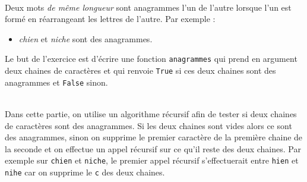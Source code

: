\documentclass[11pt,a4paper]{article}
\begin{document}
\begin{Exercise}[title = {anagrammes}] \\
	Deux mots \textit{de même longueur} sont anagrammes l'un de l'autre lorsque l'un est formé en réarrangeant les lettres de l'autre. Par exemple :
	\begin{itemize}
		\item \textit{chien} et \textit{niche} sont des anagrammes.
	\end{itemize}
	Le but de l'exercice est d'écrire une fonction {\tt anagrammes} qui prend en argument deux chaines de caractères et qui renvoie {\tt True} si ces deux chaines sont des anagrammes et {\tt False} sinon.

	\ExePart[name = Une approche récursive]\\
Dans cette partie, on utilise un algorithme récursif afin de tester si deux chaines de caractères sont des anagrammes. Si les deux chaines sont vides alors ce sont des anagrammes, sinon on supprime le premier caractère de la première chaine de la seconde et on effectue un appel récursif sur ce qu'il reste des deux chaines. Par exemple sur {\tt chien} et {\tt niche}, le premier appel récursif s'effectuerait entre {\tt hien} et {\tt nihe} car on supprime le {\tt c} des deux chaines. 
	


\end{Exercise}
\end{document}
